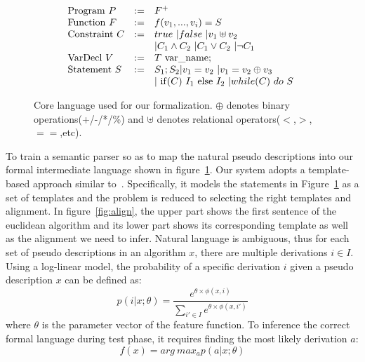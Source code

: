 \documentclass[11pt]{article}
\begin{document}
 \begin{figure}[t]
 \small
\[
\begin{array}{lll}
{\rm Program} \ P & := & F^+ \\
{\rm Function} \ F & := &  f(v_1,...,v_i) = S \\
{\rm Constraint} \ C & := & true \ | false \ | v_1 \uplus v_2 \ \\
& & | C_1 \land C_2  \ | C_1 \lor C_2 \ | \neg C_1\\
{\rm VarDecl} \ V & := & T \  {\rm var\_name}; \\
{\rm Statement} \ S & := & S_1;S_2 | v_1 = v_2 \ | v_1 = v_2 \oplus v_3 \ \\
& & |  \ {\rm if}(C) \ I_1 \ {\rm else} \ I_2 \ | while(C) \ do \ S \ \\

\end{array}
\]
\vspace{-0.2in}
\caption{Core language used for our formalization. $\oplus$ denotes 
binary operations(+/-/*/\%) and $\uplus$ denotes relational
operators($<$,$>$,$==$,etc). }\label{fig:language}
\vspace{-0.1in}
\end{figure}
To train a semantic parser so as to map the natural pseudo descriptions into our 
formal intermediate language shown in figure~\ref{fig:language}. 
Our system adopts a template-based approach similar to~\cite{word}. Specifically,  
it models the statements in Figure~\ref{fig:language} as a set of templates
and the problem is reduced to selecting the right templates and alignment. In figure~\ref{fig:align},
 the upper part shows the first sentence of the euclidean algorithm and its lower part
 shows its corresponding template as well as the alignment we need to infer.
Natural language is ambiguous, thus for each set of pseudo descriptions
in an algorithm $x$, there are multiple derivations $i\in I$. Using a 
log-linear model, the probability of a specific derivation $i$ given 
a pseudo description $x$ can be defined as:
\[
  p(i|x;\theta) = \frac{e^{\theta \times \phi(x,i)}}{\sum_{i'\in I}{e^{\theta \times \phi(x,i')}}}
\]
where $\theta$ is the parameter vector of the feature function.  To inference
the correct formal language during test phase, it requires finding the 
most likely derivation $a$: 
\[
f(x) = arg \ max_{a} p(a|x;\theta)
\]
\end{document}
